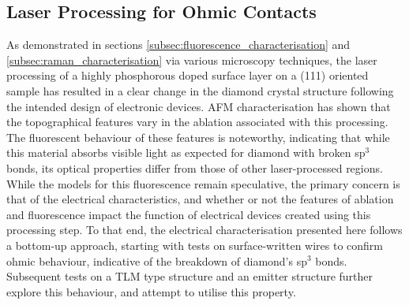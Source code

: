 \begin{refsection}
\chapter{Laser Processing for Ohmic Contacts}
\label{sec:laser_graphitisation_for_ohmic_contacts}
As demonstrated in sections \ref{subsec:fluorescence_characterisation} and \ref{subsec:raman_characterisation} via various microscopy techniques, the laser processing of a highly phosphorous doped surface layer on a \hkl(111) oriented sample has resulted in a clear change in the diamond crystal structure following the intended design of electronic devices. AFM characterisation has shown that the topographical features vary in the ablation associated with this processing. The fluorescent behaviour of these features is noteworthy, indicating that while this material absorbs visible light as expected for diamond with broken sp$^{3}$ bonds, its optical properties differ from those of other laser-processed regions. While the models for this fluorescence remain speculative, the primary concern is that of the electrical characteristics, and whether or not the features of ablation and fluorescence impact the function of electrical devices created using this processing step. To that end, the electrical characterisation presented here follows a bottom-up approach, starting with tests on surface-written wires to confirm ohmic behaviour, indicative of the breakdown of diamond's sp$^{3}$ bonds. Subsequent tests on a TLM type structure and an emitter structure further explore this behaviour, and attempt to utilise this property.


\end{refsection}

